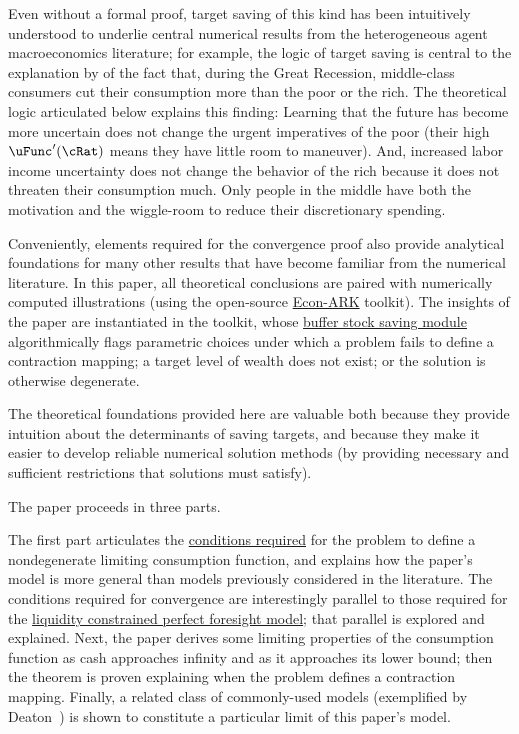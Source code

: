 \documentclass[BufferStockTheory]{subfiles}
\begin{document}
\hypertarget{KMP}{}

Even without a formal proof, target saving of this kind has been intuitively understood to underlie central numerical results from the heterogeneous agent macroeconomics literature; for example, the logic of target saving is central to the explanation by \cite{kmpHandbook} of the fact that, during the Great Recession, middle-class consumers cut their consumption more than the poor or the rich.  The theoretical logic articulated below explains this finding:  Learning that the future has become more uncertain does not change the urgent imperatives of the poor (their high $\uFunc^{\prime}(\cRat)$ means they have little room to maneuver).  And, increased labor income uncertainty does not change the behavior of the rich because it does not threaten their consumption much.  Only people in the middle have both the motivation and the wiggle-room to reduce their discretionary spending.

Conveniently, elements required for the convergence proof also provide analytical foundations for many other results that have become familiar from the numerical literature.  In this paper, all theoretical conclusions are paired with numerically computed illustrations (using the open-source \href{https://econ-ark.org}{Econ-ARK} toolkit).  The insights of the paper are instantiated in the toolkit, whose \href{https://hark.readthedocs.io/en/stable/reference/ConsumptionSaving/ConsIndShockModel.html}{buffer stock saving module} algorithmically flags parametric choices under which a problem fails to define a contraction mapping; a target level of wealth does not exist; or the solution is otherwise degenerate.

The theoretical foundations provided here are valuable both because they provide intuition about the determinants of saving targets, and because they make it easier to develop reliable numerical solution methods (by providing necessary and sufficient restrictions that solutions must satisfy).

The paper proceeds in three parts.

The first part articulates the \hyperlink{Sufficient-Conditions}{conditions required} for the problem to define a nondegenerate limiting consumption function, and explains how the paper's model is more general than models previously considered in the literature.  The conditions required for convergence are interestingly parallel to those required for the \hyperlink{Factors-Defined-And-Compared}{liquidity constrained perfect foresight model}; that parallel is explored and explained.  Next, the paper derives some limiting properties of the consumption function as cash approaches infinity and as it approaches its lower bound; then the theorem is proven explaining when the problem defines a contraction mapping.  Finally, a related class of commonly-used models (exemplified by Deaton~\citeyearpar{deatonLiqConstr}) is shown to constitute a particular limit of this paper's model.
\end{document}
